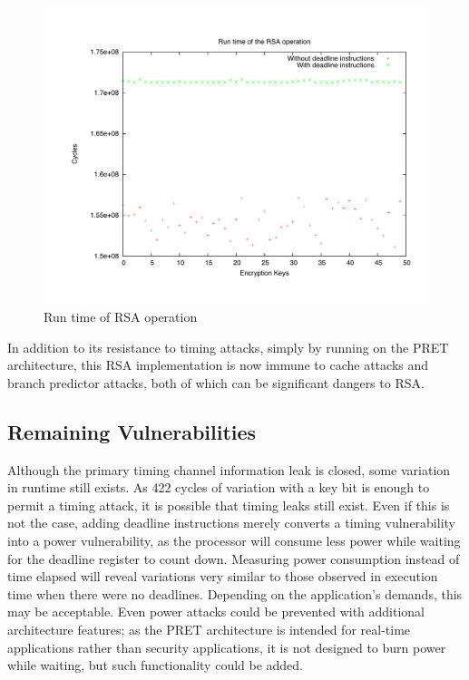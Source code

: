 \documentclass[times, 10pt,twocolumn]{article}
\begin{document}
\begin{figure}[ht]
  \centering
  \includegraphics[scale=.3]{./images/RSA.pdf}
  \caption{Run time of RSA operation}
  \label{fig:rsa}
\end{figure}

In addition to its resistance to timing attacks, simply by running on the PRET architecture, this RSA implementation is now immune to cache attacks and branch predictor attacks, both of which can be significant dangers to RSA\cite{branchpredict, Percival05cachemissing}.

\subsection{Remaining Vulnerabilities}
Although the primary timing channel information leak is closed, some variation in runtime still exists.  As 422 cycles of variation with a key bit is enough to permit a timing attack\cite{DKLMQW98}, it is possible that timing leaks still exist.  Even if this is not the case, adding deadline instructions merely converts a timing vulnerability into a power vulnerability, as the processor will consume less power while waiting for the deadline register to count down.  Measuring power consumption instead of time elapsed will reveal variations very similar to those observed in execution time when there were no deadlines.  Depending on the application's demands, this may be acceptable.  Even power attacks could be prevented with additional architecture features; as the PRET architecture is intended for real-time applications rather than security applications, it is not designed to burn power while waiting, but such functionality could be added.
\end{document}
